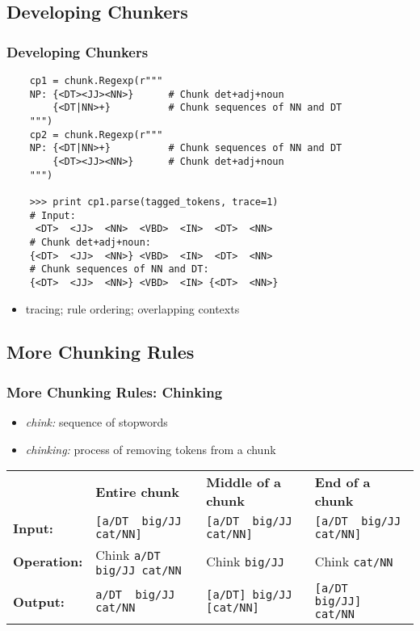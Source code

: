 \documentclass{beamer}             %
\begin{document}
\subsection{Developing Chunkers}

\begin{frame}[fragile]
  \frametitle{Developing Chunkers}
  \tiny

\begin{verbatim}
    cp1 = chunk.Regexp(r"""
    NP: {<DT><JJ><NN>}      # Chunk det+adj+noun
        {<DT|NN>+}          # Chunk sequences of NN and DT
    """)
    cp2 = chunk.Regexp(r"""
    NP: {<DT|NN>+}          # Chunk sequences of NN and DT
        {<DT><JJ><NN>}      # Chunk det+adj+noun
    """)
    
    >>> print cp1.parse(tagged_tokens, trace=1)
    # Input:
     <DT>  <JJ>  <NN>  <VBD>  <IN>  <DT>  <NN> 
    # Chunk det+adj+noun:
    {<DT>  <JJ>  <NN>} <VBD>  <IN>  <DT>  <NN> 
    # Chunk sequences of NN and DT:
    {<DT>  <JJ>  <NN>} <VBD>  <IN> {<DT>  <NN>}
\end{verbatim}

\begin{itemize}
  \item tracing; rule ordering; overlapping contexts
\end{itemize}
\end{frame}

\subsection{More Chunking Rules}

\begin{frame}[fragile]
  \frametitle{More Chunking Rules: Chinking}
  \small

  \begin{itemize}
  \item \textit{chink:} sequence of stopwords
  \item \textit{chinking:} process of removing tokens from a chunk
  \end{itemize}

  \tiny

\begin{tabular}{llll}
& \textbf{Entire chunk}
& \textbf{Middle of a chunk}
& \textbf{End of a chunk} \\
\textbf{Input:}
& \verb|[a/DT  big/JJ  cat/NN]|
& \verb|[a/DT  big/JJ  cat/NN]|
& \verb|[a/DT  big/JJ  cat/NN]| \\
\textbf{Operation:}
& Chink \verb|a/DT big/JJ cat/NN|
& Chink \verb|big/JJ|
& Chink \verb|cat/NN| \\
\textbf{Output:}
& \verb|a/DT  big/JJ  cat/NN|
& \verb|[a/DT] big/JJ [cat/NN]|
& \verb|[a/DT  big/JJ] cat/NN|
\end{tabular}
\end{frame}
\end{document}
